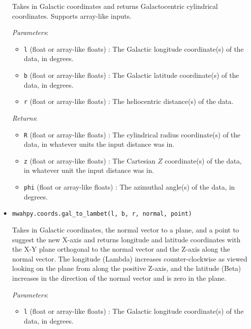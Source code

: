 \documentclass{article}
\begin{document}
\begin{itemize}
Takes in Galactic coordinates and returns Galactocentric cylindrical coordinates. Supports array-like inputs.

\textit{Parameters}: \begin{itemize}

\item \verb!l! (float or array-like floats) : The Galactic longitude coordinate(s) of the data, in degrees.

\item \verb!b! (float or array-like floats) : The Galactic latitude coordinate(s) of the data, in degrees.

\item \verb!r! (float or array-like floats) : The heliocentric distance(s) of the data.

\end{itemize}

\textit{Returns}: \begin{itemize}

\item \verb!R! (float or array-like floats) : The cylindrical radius coordinate(s) of the data, in whatever units the input distance was in.

\item \verb!z! (float or array-like floats) : The Cartesian $Z$ coordinate(s) of the data, in whatever unit the input distance was in.

\item \verb!phi! (float or array-like floats) : The azimuthal angle(s) of the data, in degrees.

\end{itemize}



\item \verb!mwahpy.coords.gal_to_lambet(l, b, r, normal, point)!

Takes in Galactic coordinates, the normal vector to a plane, and a point to suggest the new X-axis and returns longitude and latitude coordinates with the X-Y plane orthogonal to the normal vector and the Z-axis along the normal vector. The longitude (Lambda) increases counter-clockwise as viewed looking on the plane from along the positive Z-axis, and the latitude (Beta) increases in the direction of the normal vector and is zero in the plane.

\textit{Parameters}: \begin{itemize}

\item \verb!l! (float or array-like floats) : The Galactic longitude coordinate(s) of the data, in degrees.


\end{itemize}
\end{itemize}
\end{document}
